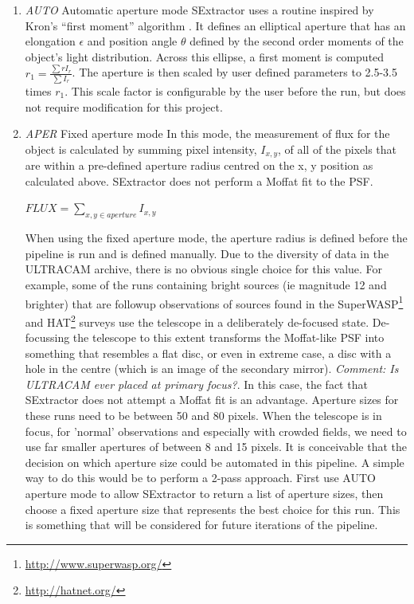 \begin{enumerate}
  \item \emph{AUTO} Automatic aperture mode
SExtractor uses a routine inspired by Kron's ``first moment'' algorithm \cite{kron}. It defines an elliptical aperture that has an elongation $\epsilon$ and position angle $\theta$ defined by the second order moments of the object's light distribution. Across this ellipse, a first moment is computed $r_1 = \frac{\sum r I_r}{\sum{I_r}}$. The aperture is then scaled by user defined parameters to 2.5-3.5 times $r_1$. This scale factor is configurable by the user before the run, but does not require modification for this project. 

  \item \emph{APER} Fixed aperture mode 
In this mode, the measurement of flux for the object is calculated by summing pixel intensity, $I_{x,y}$,  of all of the pixels that are within a pre-defined aperture radius centred on the x, y position as calculated above. SExtractor does not perform a Moffat fit to the PSF. 

$FLUX = \sum\limits_{x,y \in aperture}I_{x,y} $

When using the fixed aperture mode, the aperture radius is defined before the pipeline is run and is defined manually. Due to the diversity of data in the ULTRACAM archive, there is no obvious single choice for this value. For example, some of the runs containing bright sources (ie magnitude 12 and brighter) that are followup observations of sources found in the {SuperWASP}\footnote{\url{http://www.superwasp.org/}} and {HAT}\footnote{\url{http://hatnet.org/}} surveys use the telescope in a deliberately de-focused state. De-focussing the telescope to this extent transforms the Moffat-like PSF into something that resembles a flat disc, or even in extreme case, a disc with a hole in the centre (which is an image of the secondary mirror). \emph{Comment: Is ULTRACAM ever placed at primary focus?}. In this case, the fact that SExtractor does not attempt a Moffat fit is an advantage. Aperture sizes for these runs need to be between 50 and 80 pixels. When the telescope is in focus, for 'normal' observations and especially with crowded fields, we need to use far smaller apertures of between 8 and 15 pixels. It is conceivable that the decision on which aperture size could be automated in this pipeline. A simple way to do this would be to perform a 2-pass approach. First use AUTO aperture mode to allow SExtractor to return a list of aperture sizes, then choose a fixed aperture size that represents the best choice for this run. This is something that will be considered for future iterations of the pipeline. 


\end{enumerate}
